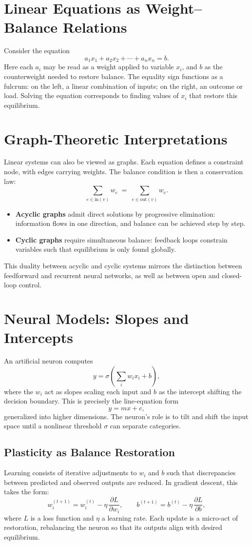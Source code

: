 \documentclass[a4paper,11pt,openany]{book}
\begin{document}
\section{Linear Equations as Weight–Balance Relations}
Consider the equation
\[
a_1 x_1 + a_2 x_2 + \cdots + a_n x_n = b.
\]
Here each $a_i$ may be read as a weight applied to variable $x_i$, and $b$ as the counterweight 
needed to restore balance. The equality sign functions as a fulcrum: on the left, a linear 
combination of inputs; on the right, an outcome or load. Solving the equation corresponds to 
finding values of $x_i$ that restore this equilibrium.

\section{Graph-Theoretic Interpretations}
Linear systems can also be viewed as graphs. Each equation defines a constraint node, with 
edges carrying weights. The balance condition is then a conservation law:
\[
\sum_{e \in \text{in}(v)} w_e \;=\; \sum_{e \in \text{out}(v)} w_e.
\]
\begin{itemize}
  \item \textbf{Acyclic graphs} admit direct solutions by progressive elimination: 
  information flows in one direction, and balance can be achieved step by step.
  \item \textbf{Cyclic graphs} require simultaneous balance: feedback loops constrain 
  variables such that equilibrium is only found globally.
\end{itemize}
This duality between acyclic and cyclic systems mirrors the distinction between feedforward 
and recurrent neural networks, as well as between open and closed-loop control.

\section{Neural Models: Slopes and Intercepts}
An artificial neuron computes
\[
y = \sigma\!\left(\sum_i w_i x_i + b\right),
\]
where the $w_i$ act as slopes scaling each input and $b$ as the intercept shifting the 
decision boundary. This is precisely the line-equation form
\[
y = m x + c,
\]
generalized into higher dimensions. The neuron’s role is to tilt and shift the input space 
until a nonlinear threshold $\sigma$ can separate categories.

\subsection*{Plasticity as Balance Restoration}
Learning consists of iterative adjustments to $w_i$ and $b$ such that discrepancies between 
predicted and observed outputs are reduced. In gradient descent, this takes the form:
\[
w_i^{(t+1)} = w_i^{(t)} - \eta \,\frac{\partial L}{\partial w_i}, \qquad 
b^{(t+1)} = b^{(t)} - \eta \,\frac{\partial L}{\partial b},
\]
where $L$ is a loss function and $\eta$ a learning rate. Each update is a micro-act of 
restoration, rebalancing the neuron so that its outputs align with desired equilibrium.
\end{document}
